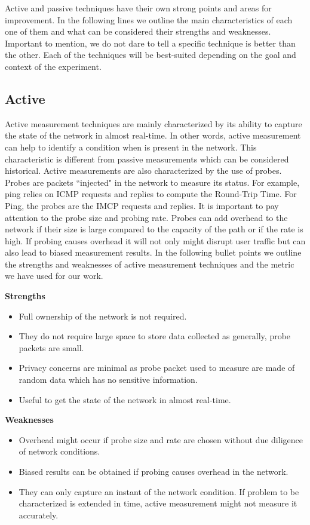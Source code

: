  Active and passive techniques have their own strong points and areas for improvement. In the following lines we outline the main characteristics of each one of them and what can be considered their strengths and weaknesses. Important to mention, we do not dare to tell a specific technique is better than the other. Each of the techniques will be best-suited depending on the  goal and context of the experiment.

\subsection*{Active}

Active measurement techniques are mainly characterized by its ability to capture the state of the network in almost real-time. In other words, active measurement can help to identify a condition when is present in the network. This characteristic is different from passive measurements which can be considered historical. Active measurements are also characterized by the use of probes. Probes are packets ``injected" in the network to measure its status. For example, ping relies on ICMP requests and replies to compute the Round-Trip Time. For Ping, the probes are the IMCP requests and replies. It is important to pay attention to the probe size and probing rate. Probes can add overhead to the network if their size is large compared to the capacity of the path or if the rate is high. If probing causes overhead it will not only might disrupt user traffic but can also lead to biased measurement results. In the following bullet points we outline the strengths and weaknesses of active measurement techniques and the metric we have used for our work.

\textbf{Strengths}
\begin{itemize}
	\item Full ownership of the network is not required.
	\item They do not require large space to store data collected as generally, probe packets are small.
	\item Privacy concerns are minimal as probe packet used to measure are made of random data which has no sensitive information.
	\item Useful to get the state of the network in almost real-time.
\end{itemize}
	

\textbf{Weaknesses}
\begin{itemize}
	\item Overhead might occur if probe size and rate are chosen without due diligence of network conditions.
	\item Biased results can be obtained if probing causes overhead in the network.
	\item They can only capture an instant of the network condition. If problem to be characterized is extended in time, active measurement might not measure it accurately.
\end{itemize}

